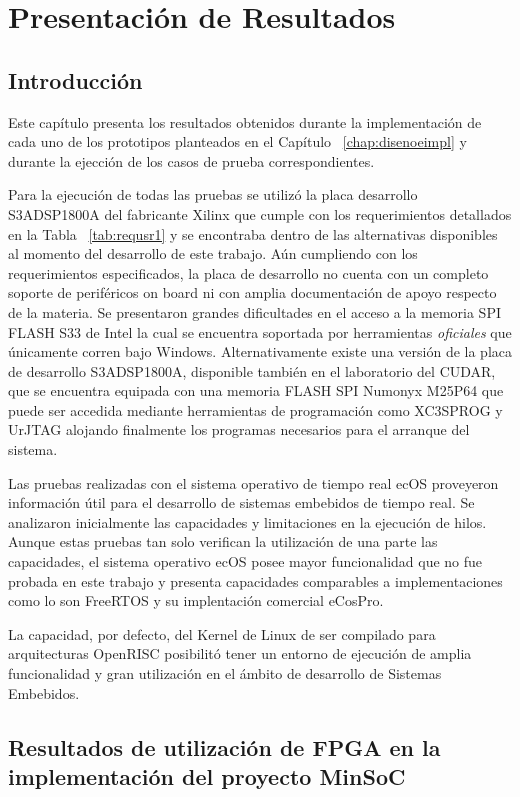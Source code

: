 \chapter{Presentación de Resultados}
	\section{Introducción} 
	
	Este capítulo presenta los resultados obtenidos durante la implementación de cada uno de los prototipos planteados en el Capítulo
	~\ref{chap:disenoeimpl} y durante la ejección de los casos de prueba correspondientes. 
	
	Para la ejecución de todas las pruebas se utilizó la placa desarrollo S3ADSP1800A del fabricante Xilinx que cumple con los requerimientos detallados
	en la Tabla ~\ref{tab:requsr1} y se encontraba dentro de las alternativas disponibles al momento del desarrollo de este trabajo. Aún cumpliendo con
	los requerimientos especificados, la placa de desarrollo no cuenta con un completo soporte de periféricos on board ni con amplia documentación de
	apoyo respecto de la materia. Se presentaron grandes dificultades en el acceso a la memoria SPI FLASH S33 de Intel la cual se encuentra soportada por
	herramientas \textit{oficiales} que únicamente corren bajo Windows. Alternativamente existe una versión de la placa de desarrollo S3ADSP1800A,
	disponible también en el laboratorio del CUDAR, que se encuentra equipada con una memoria FLASH SPI Numonyx M25P64 que puede ser accedida mediante
	herramientas de programación como XC3SPROG y UrJTAG alojando finalmente los programas necesarios para el arranque del sistema.
	
	Las pruebas realizadas con el sistema operativo de tiempo real ecOS proveyeron información útil para el desarrollo de sistemas embebidos de tiempo
	real. Se analizaron inicialmente las capacidades y limitaciones en la ejecución de hilos. Aunque estas pruebas tan solo verifican la utilización de
	una parte las capacidades, el sistema operativo ecOS posee mayor funcionalidad que no fue probada en este trabajo y presenta capacidades comparables
	a implementaciones como lo son FreeRTOS y su implentación comercial eCosPro.
	
	La capacidad, por defecto, del Kernel de Linux de ser compilado para arquitecturas OpenRISC posibilitó tener un entorno de ejecución de amplia
	funcionalidad y gran utilización en el ámbito de desarrollo de Sistemas Embebidos.  
	
	\newpage
	\section{Resultados de utilización de FPGA en la implementación del proyecto MinSoC}

